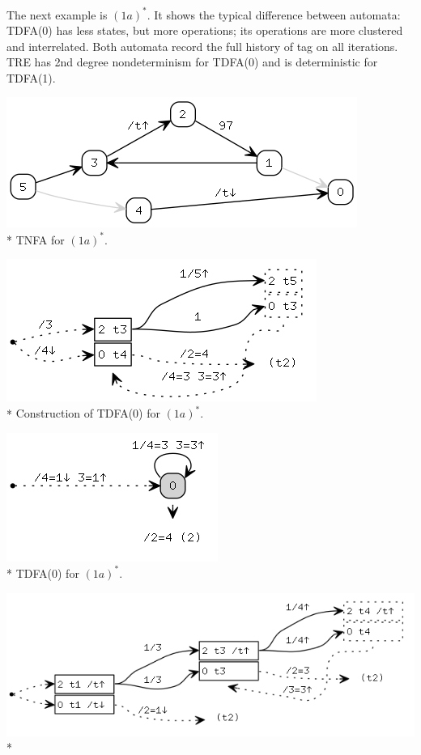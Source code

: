 \documentclass{article}
\theoremstyle{definition}
\begin{document}
\begin{multicols}{2}
The next example is $(1 a)^*$.
It shows the typical difference between automata:
TDFA(0) has less states, but more operations; its operations are more clustered and interrelated.
Both automata record the full history of tag on all iterations.
TRE has 2nd degree nondeterminism for TDFA(0) and is deterministic for TDFA(1).
\begin{center}
\includegraphics[width=0.6\linewidth]{img/example6/tnfa.png}\\*
\footnotesize{TNFA for $(1 a)^*$.} \\
\end{center}
\begin{center}
\includegraphics[width=0.6\linewidth]{img/example6/tdfa0_raw.png}\\*
\footnotesize{Construction of TDFA(0) for $(1 a)^*$.} \\
\end{center}
\begin{center}
\includegraphics[width=0.4\linewidth]{img/example6/tdfa0.png}\\*
\footnotesize{TDFA(0) for $(1 a)^*$.} \\
\end{center}
\begin{center}
\includegraphics[width=0.9\linewidth]{img/example6/tdfa1_raw.png}\\*

\end{center}
\end{multicols}
\end{document}
